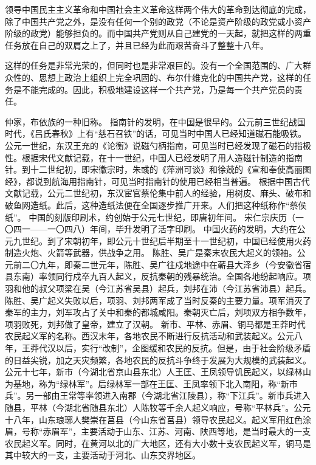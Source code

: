 领导中国民主主义革命和中国社会主义革命这样两个伟大的革命到达彻底的完成，除了中国共产党之外，是没有任何一个别的政党（不论是资产阶级的政党或小资产阶级的政党）能够担负的。而中国共产党则从自己建党的一天起，就把这样的两重任务放在自己的双肩之上了，并且已经为此而艰苦奋斗了整整十八年。

这样的任务是非常光荣的，但同时也是非常艰巨的。没有一个全国范围的、广大群众性的、思想上政治上组织上完全巩固的、布尔什维克化的中国共产党，这样的任务是不能完成的。因此，积极地建设这样一个共产党，乃是每一个共产党员的责任。


\begin{maonote}
仲家，布依族的一种旧称。
指南针的发明，在中国是很早的。公元前三世纪战国时代，《吕氏春秋》上有“慈石召铁”的话，可见当时中国人已经知道磁石能吸铁。公元一世纪，东汉王充的《论衡》说磁勺柄指南，可见当时已经发现了磁石的指极性。根据宋代文献记载，在十一世纪，中国人已经发明了用人造磁针制造的指南针。到十二世纪初，即宋徽宗时，朱彧的《萍洲可谈》和徐兢的《宣和奉使高丽图经》，都说到航海用指南针，可见当时指南针的使用已经相当普遍。
根据中国古代文献记载，公元二世纪初，东汉宦官蔡伦集中前人的经验，用树皮、麻头、破布和破鱼网造纸。此后，这种造纸法便在全国逐步推广开来。人们把这种纸称作“蔡侯纸”。
中国的刻版印刷术，约创始于公元七世纪，即唐初年间。
宋仁宗庆历（一〇四一——一〇四八）年间，毕升发明了活字印刷。
中国火药的发明，大约在公元九世纪。到了宋朝初年，即公元十世纪后半期至十一世纪初，中国已经使用火药制造火炮、火箭等武器，供战争之用。
陈胜、吴广是秦末农民大起义的领袖。公元前二〇九年，即秦二世元年，陈胜、吴广往戍地途中在蕲县大泽乡（今安徽省宿县东南）率领同行戍卒九百人起义，反抗秦朝的残暴统治。全国各地纷起响应。项羽和他的叔父项梁在吴（今江苏省吴县）起兵，刘邦在沛（今江苏省沛县）起兵。陈胜、吴广起义失败以后，项羽、刘邦两军成了当时反秦的主要力量。项军消灭了秦军的主力，刘军攻占了关中和秦的都城咸阳。秦朝灭亡后，刘项双方相争数年，项羽败死，刘邦做了皇帝，建立了汉朝。
新市、平林、赤眉、铜马都是王莽时代农民起义军的名称。西汉末年，各地农民不断进行反抗活动和武装起义。公元八年，王莽代汉以后，实行“改制”，企图缓和农民的反抗。但是，由于社会阶级矛盾的日益尖锐，加之天灾频繁，各地农民的反抗斗争终于发展为大规模的武装起义。公元十七年，新市（今湖北省京山县东北）人王匡、王凤领导饥民起义，以绿林山为基地，称为“绿林军”。后绿林军一部在王匡、王凤率领下北入南阳，称“新市兵”。另一部由王常等率领进入南郡（今湖北省江陵县），称“下江兵”。新市兵进入随县，平林（今湖北省随县东北）人陈牧等千余人起义响应，号称“平林兵”。公元十八年，山东琅琊人樊崇在莒县（今山东省莒县）领导农民起义。起义军用红色涂眉，号称“赤眉军”，主要活动于山东、江苏、河南、陕西等地，是当时最大的一支农民起义军。同时，在黄河以北的广大地区，还有大小数十支农民起义军，铜马是其中较大的一支，主要活动于河北、山东交界地区。

\end{maonote}
